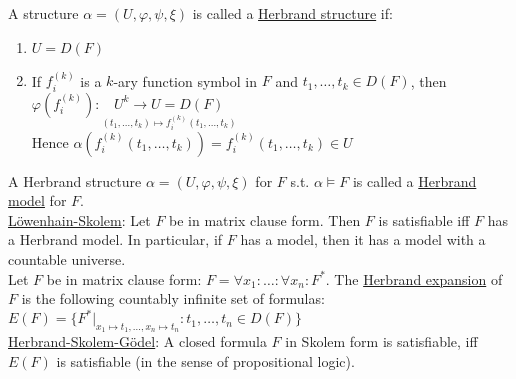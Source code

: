 \documentclass[a4paper]{article}
\newcommand{\ul}{\underline}
\let\phi\varphi
\begin{document}
A structure $\alpha=(U,\phi,\psi,\xi)$ is called a \ul{Herbrand structure} if:
\begin{enumerate}[(1)]
	\item $U=D(F)$
	\item If $f_i^{(k)}$ is a $k$-ary function symbol in $F$ and $t_1,\dots,t_k\in D(F)$, then $\phi(f_i^{(k)}):\underset{(t_1,\dots,t_k)\mapsto f_i^{(k)}(t_1,\dots,t_k)}{U^k\rightarrow U=D(F)}$\\
	Hence $\alpha(f_i^{(k)}(t_1,\dots,t_k))=f_i^{(k)}(t_1,\dots,t_k)\in U$
\end{enumerate}
A Herbrand structure $\alpha=(U,\phi,\psi,\xi)$ for $F$ s.t. $\alpha\models F$ is called a \ul{Herbrand model} for $F$.\\
\ul{Löwenhain-Skolem}: Let $F$ be in matrix clause form. Then $F$ is satisfiable iff $F$ has a Herbrand model. In particular, if $F$ has a model, then it has a model with a countable universe.\\
Let $F$ be in matrix clause form: $F=\forall x_1:\dots:\forall x_n:F^*$. The \ul{Herbrand expansion} of $F$ is the following countably infinite set of formulas: $E(F)=\{F^*\vert_{x_1\mapsto t_1,\dots,x_n\mapsto t_n}:t_1,\dots,t_n\in D(F)\}$\\
\ul{Herbrand-Skolem-Gödel}: A closed formula $F$ in Skolem form is satisfiable, iff $E(F)$ is satisfiable (in the sense of propositional logic).
\end{document}

